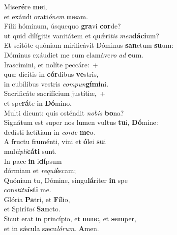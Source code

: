 \evenverse Mise\textbf{ré}re \textbf{me}i,~\*\\
\evenverse et exáudi orati\textit{ó}\textit{nem} \textbf{me}am.\\
\oddverse Fílii hóminum, úsquequo \textbf{gra}vi \textbf{cor}de?~\*\\
\oddverse ut quid dilígitis vanitátem et quǽri\textit{tis} \textit{men}\textbf{dá}\textbf{ci}um?\\
\evenverse Et scitóte quóniam mirificávit Dóminus \textbf{san}ctum \textbf{su}um:~\*\\
\evenverse Dóminus exáudiet me cum clamáve\textit{ro} \textit{ad} \textbf{e}um.\\
\oddverse Irascímini, et nolíte peccáre:~+\\
\oddverse  quæ dícitis in \textbf{cór}dibus \textbf{ve}stris,~\*\\
\oddverse in cubílibus vestris \textit{com}\textit{pun}\textbf{gí}\textbf{mi}ni.\\
\evenverse Sacrificáte sacrifícium justítiæ,~+\\
\evenverse  et spe\textbf{rá}te in \textbf{Dó}mino.~\*\\
\evenverse Multi dicunt: quis osténdit \textit{no}\textit{bis} \textbf{bo}na?\\
\oddverse Signátum est super nos lumen vultus \textbf{tu}i, \textbf{Dó}mine:~\*\\
\oddverse dedísti lætítiam in \textit{cor}\textit{de} \textbf{me}o.\\
\evenverse A fructu fruménti, vini et \textbf{ó}lei \textbf{su}i~\*\\
\evenverse mul\textit{ti}\textit{pli}\textbf{cá}\textbf{ti} sunt.\\
\oddverse In pace \textbf{in} i\textbf{dí}psum~\*\\
\oddverse dórmiam et \textit{re}\textit{qui}\textbf{é}scam;\\
\evenverse Quóniam tu, Dómine, singu\textbf{lá}riter \textbf{in} spe~\*\\
\evenverse con\textit{sti}\textit{tu}\textbf{í}\textbf{sti} me.\\
\oddverse Glória \textbf{Pa}tri, et \textbf{Fí}lio,~\*\\
\oddverse et Spirí\textit{tu}\textit{i} \textbf{San}cto.\\
\evenverse Sicut erat in princípio, et \textbf{nunc}, et \textbf{sem}per,~\*\\
\evenverse et in sǽcula sæcu\textit{ló}\textit{rum}. \textbf{A}men.\\
